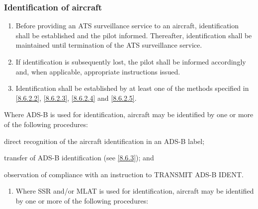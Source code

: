 
\subsubsection{Identification of aircraft}

\begin{enumeratesc}
    \begin{enumerate}
        \item Before providing an ATS surveillance service to an aircraft, identification shall be established and the pilot informed. Thereafter, identification shall be maintained until termination of the ATS surveillance service.
        \item If identification is subsequently lost, the pilot shall be informed accordingly and, when applicable, appropriate instructions issued.
        \item Identification shall be established by at least one of the methods specified in \ref{8.6.2.2}, \ref{8.6.2.3}, \ref{8.6.2.4} and \ref{8.6.2.5}.
    \end{enumerate}

     \label{8.6.2.2}
    \begin{enumempty}
        \item Where ADS-B is used for identification, aircraft may be identified by one or more of the following procedures:
    \end{enumempty}
    \begin{enumalph}
        \item direct recognition of the aircraft identification in an ADS-B label;
        \item transfer of ADS-B identification (see \ref{8.6.3}); and
        \item observation of compliance with an instruction to TRANSMIT ADS-B IDENT.
    \end{enumalph}
    
     \label{8.6.2.3}
    \begin{enumerate}
        \item Where SSR and/or MLAT is used for identification, aircraft may be identified by one or more of the following procedures:
        

\end{enumerate}
\end{enumeratesc}
